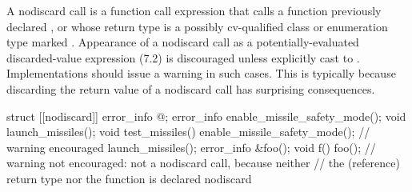 \documentclass[ebook,11pt,article]{memoir}
\begin{document}
\pnum
\begin{note}
A nodiscard call is a function call expression 
that
calls a function 
previously declared , or
whose return type
is a possibly cv-qualified class or enumeration type
marked . Appearance of a nodiscard call as
a potentially-evaluated discarded-value expression (7.2)%
is discouraged unless explicitly cast to .
Implementations should issue a warning in such cases.
This is typically because discarding the return value
of a nodiscard call has surprising consequences.
\end{note}

\pnum
\begin{example}
\begin{codeblock}
struct [[nodiscard]] error_info { @\commentellip@ };
error_info enable_missile_safety_mode();
void launch_missiles();
void test_missiles() {
  enable_missile_safety_mode(); // warning encouraged
  launch_missiles();
}
error_info &foo();
void f() { foo(); }             // warning not encouraged: not a nodiscard call, because neither
                                // the (reference) return type nor the function is declared nodiscard
\end{codeblock}
\end{example}
\end{document}
